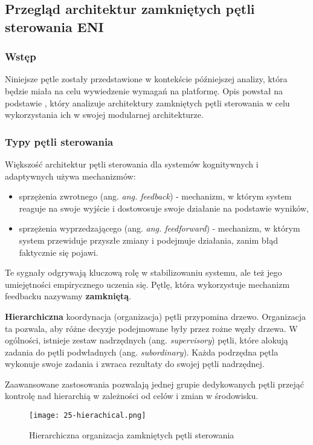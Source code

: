 \subsection{Przegląd architektur zamkniętych pętli sterowania ENI}\hypertarget{sec:25}{}

\subsubsection{Wstęp}

Niniejsze pętle zostały przedstawione w kontekście późniejszej analizy, która będzie miała na celu wywiedzenie wymagań na platformę. Opis powstał na podstawie \cite{etsieni2024}, który analizuje architektury zamkniętych pętli sterowania w celu wykorzystania ich w swojej modularnej architekturze. 
\subsubsection{Typy pętli sterowania}

Większość architektur pętli sterowania dla systemów kognitywnych i adaptywnych używa mechanizmów:
\begin{itemize}
    \item sprzężenia zwrotnego (ang. \textit{ang. feedback}) - mechanizm, w którym system reaguje na swoje wyjście i dostowosuje swoje działanie na podstawie wyników,
    \item sprzężenia wyprzedzającego (ang. \textit{ang. feedforward}) - mechanizm, w którym system przewiduje przyszłe zmiany i podejmuje działania, zanim błąd faktycznie się pojawi.
\end{itemize}

Te sygnały odgrywają kluczową rolę w stabilizowaniu systemu, ale też jego umiejętności empirycznego uczenia się. Pętlę, która wykorzystuje mechanizm feedbacku nazywamy \textbf{zamkniętą}.

\textbf{Hierarchiczna} koordynacja (organizacja) pętli przypomina drzewo. Organizacja ta pozwala, aby różne decyzje podejmowane były przez rożne węzły drzewa. W ogólności, istnieje zestaw nadrzędnych (ang. \textit{supervisory}) pętli, które alokują zadania do pętli podwładnych (ang. \textit{subordinary}). Każda podrzędna pętla wykonuje swoje zadania i zwraca rezultaty do swojej pętli nadrzędnej. 

Zaawansowane zastosowania pozwalają jednej grupie dedykowanych pętli przejąć kontrolę nad hierarchią w zależności od celów i zmian w środowisku. 


\begin{figure}[!h]
    \centering \texttt{[image: 25-hierachical.png]}
    \caption{Hierarchiczna organizacja zamkniętych pętli sterowania}\label{fig:25-hierachical}
\end{figure}

